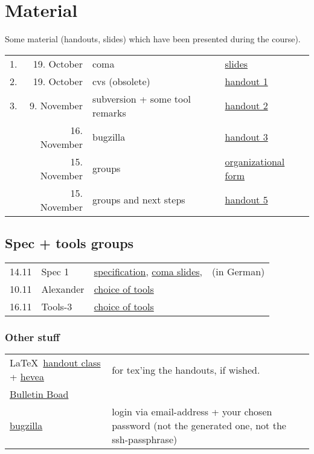 

\section*{Material}

Some material (handouts, slides) which have been presented during the
course).

\begin{tabular}{r@{\quad\quad}rll}
  \hline
  1. & 19. October & coma  & 
  \href{slides/main-coma.pdf}{slides}
  \\
  2. & 19. October & cvs (obsolete) & \href{handouts/handout1.pdf}{handout 1}
  \\
  3. & 9. November & subversion + some tool remarks &
  \href{handouts/handout2.pdf}{handout 2}
  \\
   & 16. November & bugzilla &
  \href{handouts/handout3.pdf}{handout 3}
  \\
   & 15. November & groups &
  \href{handouts/handout4.pdf}{organizational form}
  \\
   & 15. November & groups and next steps &
  \href{handouts/handout5.pdf}{handout 5}
  \\
\end{tabular}




\subsection{Spec + tools groups}
\label{sec:material.spec-tools}


\begin{tabular}{llll}
  14.11 & Spec 1 & 
  \href{spec/material/spec1/spezifikation.pdf}{specification}, 
  \href{spec/material/spec1/slides.pdf}{coma slides}, 
  & (in German)
  \\
  10.11 & Alexander & \href{spec/material/derenbach/tools.pdf}{choice of tools}
  \\
  16.11 & Tools-3 & \href{spec/material/tools3/tools.pdf}{choice of tools}
\end{tabular}




\subsubsection*{Other stuff}

\begin{tabular}{lp{8cm}}
 \LaTeX\ \href{misc/handout.cls}{handout class}  +
 \href{misc/hevea.sty}{hevea} & for tex'ing the handouts, if wished.
 \\
 \href{http://snert.informatik.uni-kiel.de:8080/~swprakt/phpBB2/}{Bulletin Boad}  
 \\
 \href{http://snert.informatik.uni-kiel.de:8080/~swprakt/bugzilla}{bugzilla}  
 &
 login via email-address + your chosen password (not the generated one, not the ssh-passphrase)
\end{tabular}





